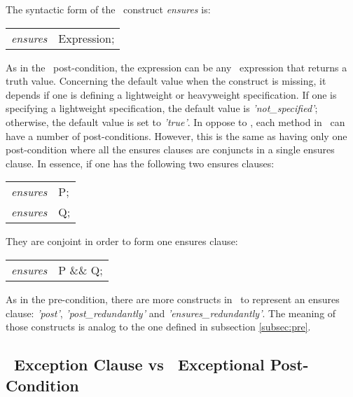 The syntactic form of the \jml\ construct \textit{ensures} is:

\begin{center}
\begin{tabular}{ll}
\textit{ensures} & Expression;\\
\end{tabular}
\end{center}

As in the \vpp\ post-condition, the expression can be any \jml\ expression that returns a truth value. Concerning the default value when the construct is missing, it depends if one is defining a lightweight or heavyweight specification. If one is specifying a lightweight specification, the default value is \textit{'not\_specified'}; otherwise, the default value is set to \textit{'true'}. In oppose to \vpp, each method in \jml\ can have a number of post-conditions. However, this is the same as having only one post-condition where all the ensures clauses are conjuncts in a single ensures clause. In essence, if one has the following two ensures clauses:

\begin{center}
\begin{tabular}{ll}
\textit{ensures} & P;\\
\textit{ensures} & Q;\\
\end{tabular}
\end{center}

They are conjoint in order to form one ensures clause:

\begin{center}
\begin{tabular}{ll}
\textit{ensures} & P \&\& Q;\\
\end{tabular}
\end{center}

As in the pre-condition, there are more constructs in \jml\ to represent an ensures clause: \textit{'post'}, \textit{'post\_redundantly'} and \textit{'ensures\_redundantly'}. The meaning of those constructs is analog to the one defined in subsection \ref{subsec:pre}.

\subsection{\vpp\ Exception Clause vs \jml\ Exceptional Post-Condition}
\label{subsec:exception}

